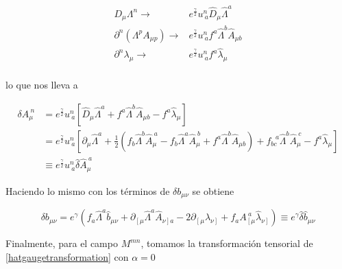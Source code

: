 \documentclass{article}
\numberwithin{equation}{section}
\begin{document}
\begin{equation}
\begin{aligned}
D_{\mu}\Lambda^n \longrightarrow& e^{\frac{\gamma}{2}} u^n_{\ a} \hat{D}_{\mu}\hat{\Lambda}^a\\
\partial^n \left( \Lambda^p A_{\mu p} \right) \longrightarrow& e^{\frac{\gamma}{2}} u^n_{\ a} f^a \hat{\Lambda}^b \hat{A}_{\mu b}\\
\partial^n \lambda_{\mu} \longrightarrow& e^{\frac{\gamma}{2}} u^n_{\ a} f^a \hat{\lambda}_{\mu}\\
\end{aligned}
\end{equation}

lo que nos lleva a 

\begin{boxeq}
	\begin{equation}\label{hatAtransformation}
	\begin{aligned}
	\delta A_{\mu}^{\ n} &=  e^{\frac{\gamma}{2}} u^n_{\ a} \left[ \hat{D}_{\mu}\hat{\Lambda}^a + f^a \hat{\Lambda}^b \hat{A}_{\mu b} - f^a \hat{\lambda}_{\mu} \right]\\
	&=e^{\frac{\gamma}{2}} u^n_{\ a} \left[ \partial_{\mu} \hat{\Lambda}^a + \frac{1}{2} \left( f_b \hat{\Lambda}^b \hat{A}_{\mu}^{\ a} - f_b \hat{\Lambda}^a \hat{A}_{\mu}^{\ b} +f^a \hat{\Lambda}^b \hat{A}_{\mu b}\right) + f_{b c}^{\ \ \ a} \hat{\Lambda}^b \hat{A}_{\mu}^{\ c} - f^a \hat{\lambda}_{\mu} \right]\\
	&\equiv e^{\frac{\gamma}{2}} u^n_{\ a} \hat{\delta} \hat{A}_{\mu}^{\ a}
	\end{aligned}
	\end{equation}
\end{boxeq}

Haciendo lo mismo con los términos de $ \delta b_{\mu \nu} $ se obtiene\\

\begin{boxeq}
	\begin{equation}
	\delta b_{\mu \nu} = e^{\gamma} \left( f_a \hat{\Lambda}^a \hat{b}_{\mu \nu} + \partial_{\left[ \mu\right.} \hat{\Lambda}^a \hat{A}_{\left. \nu \right] a} -2 \partial_{\left[ \mu\right.} \hat{\lambda}_{\left. \nu \right]} + f_a A_{\left[ \mu\right.}^{\ a} \hat{\lambda}_{\left. \nu \right]}\right) \equiv e^{\gamma} \hat{\delta} \hat{b}_{\mu \nu}
	\end{equation}
\end{boxeq}

Finalmente, para el campo $ M^{m n} $, tomamos la transformación tensorial de \ref{hatgaugetransformation} con $ \alpha=0 $
\end{document}
